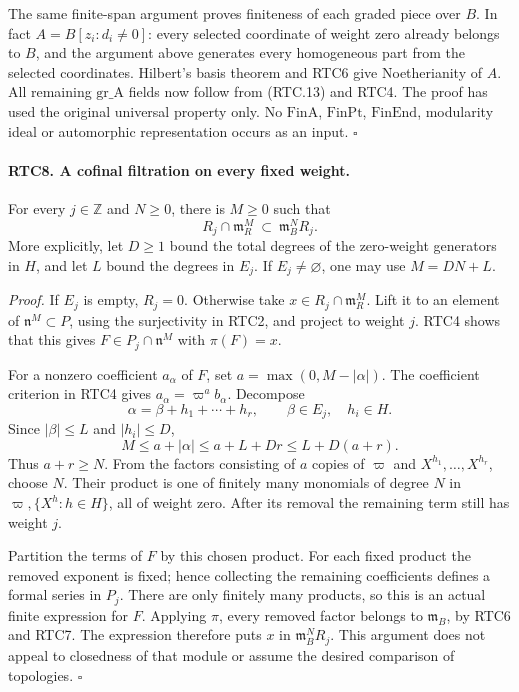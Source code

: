 The same finite-span argument proves finiteness of each graded
piece over \(B\).  In fact
\(A=B[z_i:d_i\ne0]\): every selected coordinate of weight zero
already belongs to \(B\), and the argument above generates every
homogeneous part from the selected coordinates.  Hilbert's basis
theorem and RTC6 give Noetherianity of \(A\).  All remaining
\(\mathrm{gr\_A}\) fields now follow from (RTC.13) and RTC4.
The proof has used the original universal property only.  No
\(\mathrm{FinA}\), \(\mathrm{FinPt}\), \(\mathrm{FinEnd}\),
modularity ideal or automorphic representation occurs as an input.
\hfill\(\square\)

\paragraph{RTC8. A cofinal filtration on every fixed weight.}
\label{claim:RTC8}
For every \(j\in\mathbb Z\) and \(N\geq0\), there is
\(M\geq0\) such that
\[
 R_j\cap\mathfrak m_R^M\ \subset\ \mathfrak m_B^N R_j.
                                                        \tag{RTC.14}
\]
More explicitly, let \(D\geq1\) bound the total degrees of
the zero-weight generators in \(H\), and let \(L\) bound the
degrees in \(E_j\).  If \(E_j\ne\varnothing\), one may use
\(M=DN+L\).

\emph{Proof.}
If \(E_j\) is empty, \(R_j=0\).  Otherwise take
\(x\in R_j\cap\mathfrak m_R^M\).  Lift it to an element of
\(\mathfrak n^M\subset P\), using the surjectivity in RTC2,
and project to weight \(j\).  RTC4 shows that this gives
\(F\in P_j\cap\mathfrak n^M\) with \(\pi(F)=x\).

For a nonzero coefficient \(a_\alpha\) of \(F\), set
\(a=\max(0,M-|\alpha|)\).  The coefficient criterion in
RTC4 gives \(a_\alpha=\varpi^a b_\alpha\).  Decompose
\[
 \alpha=\beta+h_1+\cdots+h_r,
       \qquad\beta\in E_j,\quad h_i\in H.
\]
Since \(|\beta|\leq L\) and \(|h_i|\leq D\),
\[
 M\leq a+|\alpha|\leq a+L+Dr\leq L+D(a+r).
\]
Thus \(a+r\geq N\).  From the factors consisting of \(a\)
copies of \(\varpi\) and \(X^{h_1},\ldots,X^{h_r}\),
choose \(N\).  Their product is one of finitely many monomials
of degree \(N\) in
\(\varpi,\{X^h:h\in H\}\), all of weight zero.  After its
removal the remaining term still has weight \(j\).

Partition the terms of \(F\) by this chosen product.  For each
fixed product the removed exponent is fixed; hence collecting the
remaining coefficients defines a formal series in \(P_j\).
There are only finitely many products, so this is an actual finite
expression for \(F\).  Applying \(\pi\), every removed factor
belongs to \(\mathfrak m_B\), by RTC6 and RTC7.  The expression
therefore puts \(x\) in \(\mathfrak m_B^N R_j\).
This argument does not appeal to closedness of that module or
assume the desired comparison of topologies. \hfill\(\square\)

